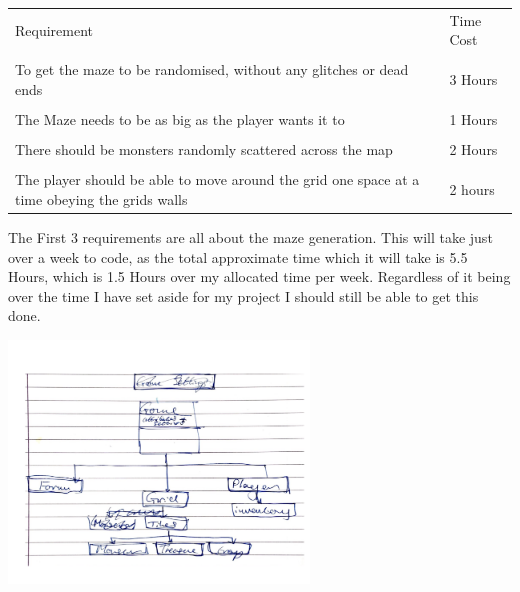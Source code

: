 \documentclass[12pt]{article}
\begin{document}
\begin{tabularx}{\linewidth}{XX}
Requirement                                                                                   & Time Cost \\ \\
To get the maze to be randomised, without any glitches or dead ends                           & 3 Hours   \\ \\
The Maze needs to be as big as the player wants it to                                         & 1 Hours   \\ \\
There should be monsters randomly scattered across the map                                    & 2 Hours   \\ \\
The player should be able to move around the grid one space at a time obeying the grids walls & 2 hours  
\end{tabularx}

The First 3 requirements are all about the maze generation. This will take just over a week to code, as the total approximate time which it will take is 5.5 Hours, which is 1.5 Hours over my allocated time per week. Regardless of it being over the time I have set aside for my project I should still be able to get this done. 

\includegraphics[width = 0.6\textwidth]{diagram_one}
\end{document}
